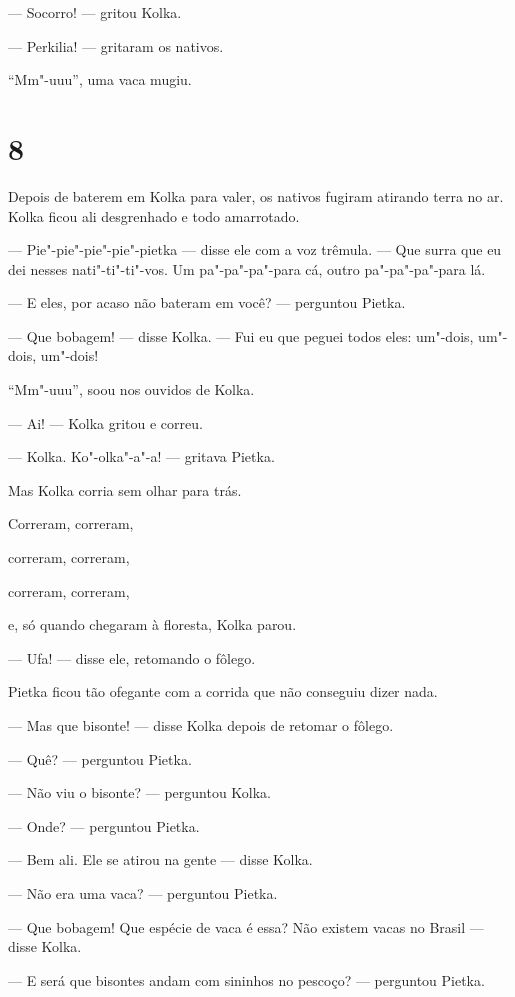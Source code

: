 --- Socorro! --- gritou Kolka.

--- Perkilia! --- gritaram os nativos.

``Mm"-uuu'', uma vaca mugiu.

\section{8}

Depois de baterem em Kolka para valer, os nativos fugiram atirando terra
no ar. Kolka ficou ali desgrenhado e todo amar­rotado.

--- Pie"-pie"-pie"-pie"-pietka --- disse ele com a voz trêmula. --- Que
surra que eu dei nesses nati"-ti"-ti"-vos. Um pa"-pa"-pa"-para cá, outro
pa"-pa"-pa"-para lá.

--- E eles, por acaso não bateram em você? --- perguntou Pietka.

--- Que bobagem! --- disse Kolka. --- Fui eu que peguei todos eles:
um"-dois, um"-dois, um"-dois!

``Mm"-uuu'', soou nos ouvidos de Kolka.

--- Ai! --- Kolka gritou e correu.

--- Kolka. Ko"-olka"-a"-a! --- gritava Pietka.

Mas Kolka corria sem olhar para trás.

Correram, correram,

correram, correram,

correram, correram,

e, só quando chegaram à floresta, Kolka parou.

--- Ufa! --- disse ele, retomando o fôlego.

Pietka ficou tão ofegante com a corrida que não conseguiu dizer nada.

--- Mas que bisonte! --- disse Kolka depois de retomar o fôlego.

--- Quê? --- perguntou Pietka.

--- Não viu o bisonte? --- perguntou Kolka.

--- Onde? --- perguntou Pietka.

--- Bem ali. Ele se atirou na gente --- disse Kolka.

--- Não era uma vaca? --- perguntou Pietka.

--- Que bobagem! Que espécie de vaca é essa? Não existem vacas no Brasil
--- disse Kolka.

--- E será que bisontes andam com sininhos no pescoço? --- perguntou
Pietka.


